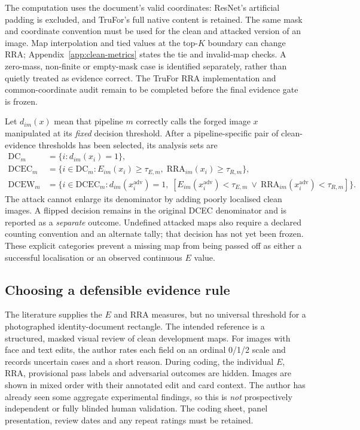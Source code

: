The computation uses the document's valid coordinates: ResNet's artificial padding is excluded, and TruFor's full native content is retained. The same mask and coordinate convention must be used for the clean and attacked version of an image. Map interpolation and tied values at the top-$K$ boundary can change RRA; Appendix~\ref{app:clean-metrics} states the tie and invalid-map checks. A zero-mass, non-finite or empty-mask case is identified separately, rather than quietly treated as evidence correct. The TruFor RRA implementation and common-coordinate audit remain to be completed before the final evidence gate is frozen.

Let $d_{im}(x)$ mean that pipeline $m$ correctly calls the forged image $x$ manipulated at its \emph{fixed} decision threshold. After a pipeline-specific pair of clean-evidence thresholds has been selected, its analysis sets are
\begin{align}
\mathrm{DC}_m&=\{i:d_{im}(x_i)=1\},\\
\mathrm{DCEC}_m&=\{i\in\mathrm{DC}_m:E_{im}(x_i)\geq\tau_{E,m},\;
 \mathrm{RRA}_{im}(x_i)\geq\tau_{R,m}\},\\
\mathrm{DCEW}_m&=\{i\in\mathrm{DCEC}_m:d_{im}(x_i^{\mathrm{adv}})=1,\;
 [E_{im}(x_i^{\mathrm{adv}})<\tau_{E,m}\ \lor\
 \mathrm{RRA}_{im}(x_i^{\mathrm{adv}})<\tau_{R,m}]\}.
\label{eq:method-stages}
\end{align}
The attack cannot enlarge its denominator by adding poorly localised clean images. A flipped decision remains in the original DCEC denominator and is reported as a \emph{separate} outcome. Undefined attacked maps also require a declared counting convention and an alternate tally; that decision has not yet been frozen. These explicit categories prevent a missing map from being passed off as either a successful localisation or an observed continuous $E$ value.

\subsection{Choosing a defensible evidence rule}

The literature supplies the $E$ and RRA measures, but no universal threshold for a photographed identity-document rectangle. The intended reference is a structured, masked visual review of clean development maps. For images with face and text edits, the author rates each field on an ordinal 0/1/2 scale and records uncertain cases and a short reason. During coding, the individual $E$, RRA, provisional pass labels and adversarial outcomes are hidden. Images are shown in mixed order with their annotated edit and card context. The author has already seen some aggregate experimental findings, so this is \emph{not} prospectively independent or fully blinded human validation. The coding sheet, panel presentation, review dates and any repeat ratings must be retained.

